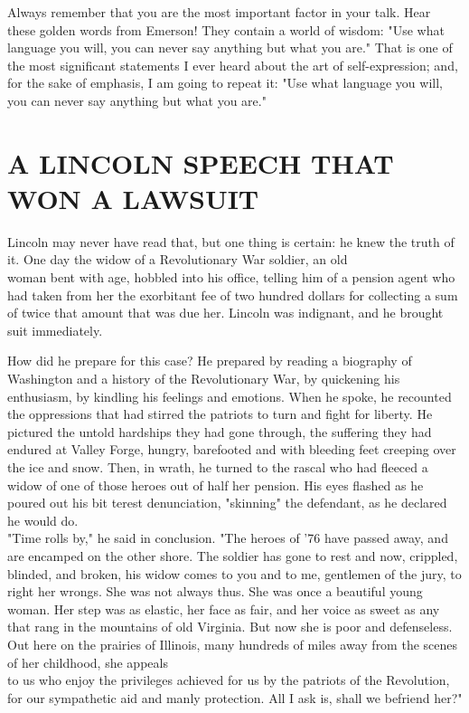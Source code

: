 \documentclass[10pt]{article}
\begin{document}
Always remember that you are the most important factor in your talk. Hear these golden words from Emerson! They contain a world of wisdom: "Use what language you will, you can never say anything but what you are." That is one of the most significant statements I ever heard about the art of self-expression; and, for the sake of emphasis, I am going to repeat it: "Use what language you will, you can never say anything but what you are."

\section*{A LINCOLN SPEECH THAT WON A LAWSUIT}
Lincoln may never have read that, but one thing is certain: he knew the truth of it. One day the widow of a Revolutionary War soldier, an old\\
woman bent with age, hobbled into his office, telling him of a pension agent who had taken from her the exorbitant fee of two hundred dollars for collecting a sum of twice that amount that was due her. Lincoln was indignant, and he brought suit immediately.

How did he prepare for this case? He prepared by reading a biography of Washington and a history of the Revolutionary War, by quickening his enthusiasm, by kindling his feelings and emotions. When he spoke, he recounted the oppressions that had stirred the patriots to turn and fight for liberty. He pictured the untold hardships they had gone through, the suffering they had endured at Valley Forge, hungry, barefooted and with bleeding feet creeping over the ice and snow. Then, in wrath, he turned to the rascal who had fleeced a widow of one of those heroes out of half her pension. His eyes flashed as he poured out his bit terest denunciation, "skinning" the defendant, as he declared he would do.\\
"Time rolls by," he said in conclusion. "The heroes of '76 have passed away, and are encamped on the other shore. The soldier has gone to rest and now, crippled, blinded, and broken, his widow comes to you and to me, gentlemen of the jury, to right her wrongs. She was not always thus. She was once a beautiful young woman. Her step was as elastic, her face as fair, and her voice as sweet as any that rang in the mountains of old Virginia. But now she is poor and defenseless. Out here on the prairies of Illinois, many hundreds of miles away from the scenes of her childhood, she appeals\\
to us who enjoy the privileges achieved for us by the patriots of the Revolution, for our sympathetic aid and manly protection. All I ask is, shall we befriend her?"
\end{document}
